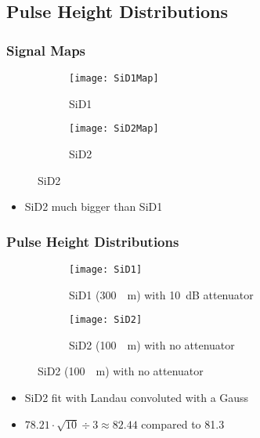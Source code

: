 \subsection{Pulse Height Distributions}
\begin{frame}
	\frametitle{Signal Maps}
	\begin{figure} 
		\begin{center}
			\begin{subfigure}{0.45\textwidth}  
				\centering 
				\texttt{[image: SiD1Map]}
				\caption{SiD1}
			\end{subfigure}
			\begin{subfigure}{0.45\textwidth} 
				\centering 
				\texttt{[image: SiD2Map]}
				\caption{SiD2}
			\end{subfigure} 
		\end{center}
	\end{figure}
	\begin{itemize}
		\item SiD2 much bigger than SiD1
	\end{itemize}
\end{frame}
\begin{frame}
	\frametitle{Pulse Height Distributions}
	\begin{figure} 
		\begin{center}
			\begin{subfigure}{0.45\textwidth}  
				\centering 
				\texttt{[image: SiD1]}
				\caption{SiD1 (\SI{300}{\upmu\meter}) with \SI{10}{dB} attenuator}
			\end{subfigure}
			\begin{subfigure}{0.45\textwidth} 
				\centering 
				\texttt{[image: SiD2]}
				\caption{SiD2 (\SI{100}{\upmu\meter}) with no attenuator}
			\end{subfigure} 
		\end{center}
	\end{figure}
	\begin{itemize}
		\item SiD2 fit with Landau convoluted with a Gauss
		\item $78.21 \cdot \sqrt{10} \div 3 \approx 82.44$ compared to 81.3
	\end{itemize}
\end{frame}